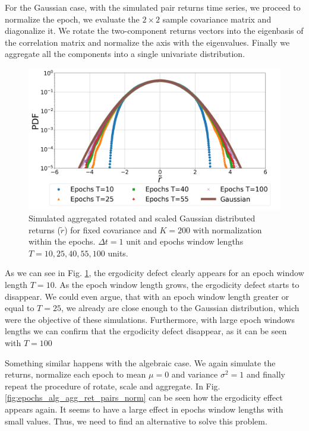 For the Gaussian case, with the simulated pair returns time series, we proceed
to normalize the epoch, we evaluate the $2 \times 2$ sample covariance matrix
and diagonalize it. We rotate the two-component returns vectors into the
eigenbasis of the correlation matrix and normalize the axis with the
eigenvalues. Finally we aggregate all the components into a single univariate
distribution.

\begin{figure}[htbp]
    \centering
    \includegraphics[width=0.6\columnwidth]
    {figures/06_epochs_sim_gauss_agg_ret_pairs_norm.png}
    \caption{Simulated aggregated rotated and scaled Gaussian distributed
             returns ($\tilde{r}$) for fixed covariance and $K=200$ with
             normalization within the epochs. $\Delta t = 1$ unit and epochs
             window lengths $T=10, 25, 40, 55, 100$ units.}
    \label{fig:epochs_gauss_agg_ret_pairs_norm}
\end{figure}

As we can see in Fig. \ref{fig:epochs_gauss_agg_ret_pairs_norm}, the ergodicity
defect clearly appears for an epoch window length $T = 10$. As the epoch window
length grows, the ergodicity defect starts to disappear. We could even argue,
that with an epoch window length greater or equal to $T = 25$, we already are
close enough to the Gaussian distribution, which were the objective of these
simulations. Furthermore, with large epoch windows lengths we can confirm that
the ergodicity defect disappear, as it can be seen with $T = 100$

Something similar happens with the algebraic case. We again simulate the
returns, normalize each epoch to mean $\mu = 0$ and variance $\sigma^{2} = 1$
and finally repeat the procedure of rotate, scale and aggregate. In Fig.
\ref{fig:epochs_alg_agg_ret_pairs_norm} can be seen how the ergodicity effect
appears again. It seems to have a large effect in epochs window lengths with
small values. Thus, we need to find an alternative to solve this problem.

